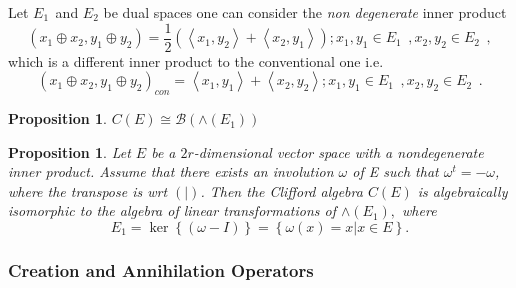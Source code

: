 \documentclass[aps,preprint]{revtex4}%
\newtheorem{proposition}[theorem]{Proposition}
\begin{document}
Let $E_{1\text{ }}$and $E_{2}$ be dual spaces one can consider the \emph{non
degenerate} inner product
\begin{equation}
\left(  x_{1}\oplus x_{2},y_{1}\oplus y_{2}\right)  =\frac{1}{2}\left(
\left\langle x_{1},y_{2}\right\rangle +\left\langle x_{2},y_{1}\right\rangle
\right)  ;x_{1},y_{1}\in E_{1\text{ }},x_{2},y_{2}\in E_{2\text{ }},
\end{equation}
which is a different inner product to the conventional one i.e.
\begin{equation}
\left(  x_{1}\oplus x_{2},y_{1}\oplus y_{2}\right)  _{con}=\left\langle
x_{1},y_{1}\right\rangle +\left\langle x_{2},y_{2}\right\rangle ;x_{1}%
,y_{1}\in E_{1\text{ }},x_{2},y_{2}\in E_{2\text{ }}.
\end{equation}


\begin{proposition}
$C\left(  E\right)  \cong\mathcal{B}\left(  \wedge\left(  E_{1}\right)
\right)  $
\end{proposition}

\begin{proposition}
Let $E$ be a $2r$-dimensional vector space with a \emph{nondegenerate} inner
product. Assume that there exists an involution $\omega$ of E such that
$\omega^{t}=-\omega$, where the transpose is wrt $\left(  \left.
{}\right\vert \right)  $. Then the Clifford algebra $C\left(  E\right)  $ is
\emph{algebraically} isomorphic to the algebra of linear transformations of
$\wedge\left(  E_{1}\right)  ,$ where
\begin{equation}
E_{1}=\ker\left\{  (\omega-I)\right\}  =\left\{  \left.  \omega\left(
x\right)  =x\right\vert x\in E\right\}  .
\end{equation}

\end{proposition}

\subsubsection{Creation and Annihilation Operators}
\end{document}
